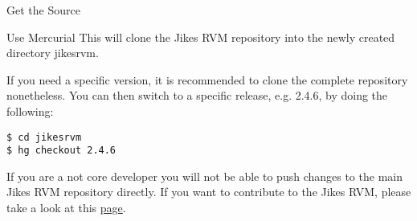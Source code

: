 \begin{chapter}{Get the Source}
\begin{section}{Use Mercurial}
This will clone the Jikes RVM repository into the newly created directory jikesrvm.

If you need a specific version, it is recommended to clone the complete repository nonetheless. You can then switch to a specific release, e.g. 2.4.6, by doing the following:

\begin{lstlisting}
$ cd jikesrvm
$ hg checkout 2.4.6
\end{lstlisting}

If you are a not core developer you will not be able to push changes to the main Jikes RVM repository directly. If you want to contribute to the Jikes RVM, please take a look at this \href{http://www.jikesrvm.org/Contributions/}{page}.

\end{section}

\end{chapter}
